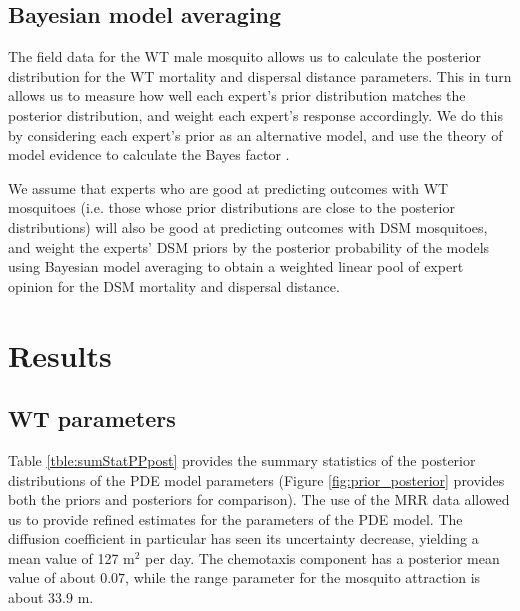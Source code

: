 \documentclass[]{bmcart}
\begin{document}
\subsection{Bayesian model averaging}
The field data for the WT male mosquito allows us to calculate the posterior distribution for the WT mortality and dispersal distance parameters. This in turn allows us to measure how well each expert's prior distribution matches the posterior distribution, and weight each expert's response accordingly. We do this by considering each expert's prior as an alternative model, and use the theory of model evidence \cite{robert2001bayesian} to calculate the Bayes factor \citep{Kass1995b, Hosack2020}. 

We assume that experts who are good at predicting outcomes with WT mosquitoes (i.e. those whose prior distributions are close to the posterior distributions) will also be good at predicting outcomes with DSM mosquitoes, and weight the experts' DSM priors by the posterior probability of the models using Bayesian model averaging to obtain a weighted linear pool of expert opinion for the DSM mortality and dispersal distance.

\section{Results}
\subsection{WT parameters}
Table \ref{tble:sumStatPPpost} provides the summary statistics of the posterior distributions of the PDE model parameters (Figure \ref{fig:prior_posterior} provides both the priors and posteriors for comparison). The use of the MRR data allowed us to provide refined estimates for the parameters of the PDE model. The diffusion coefficient in particular has seen its uncertainty decrease, yielding a mean value of 127 m$^2$ per day. The chemotaxis component has a posterior mean value of about $0.07$, while the range parameter for the mosquito attraction is about $33.9$ m.\\
\end{document}
